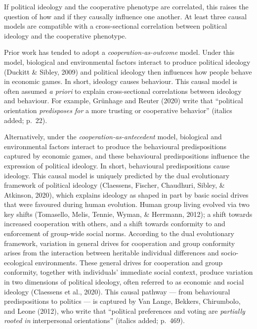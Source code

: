 \documentclass[
  man,floatsintext]{apa6}
\begin{document}
If political ideology and the cooperative phenotype are correlated, this raises the question of how and if they causally influence one another. At least three causal models are compatible with a cross-sectional correlation between political ideology and the cooperative phenotype.

Prior work has tended to adopt a \emph{cooperation-as-outcome} model. Under this model, biological and environmental factors interact to produce political ideology (Duckitt \& Sibley, 2009) and political ideology then influences how people behave in economic games. In short, ideology causes behaviour. This causal model is often assumed \emph{a priori} to explain cross-sectional correlations between ideology and behaviour. For example, Grünhage and Reuter (2020) write that ``political orientation \emph{predisposes for} a more trusting or cooperative behavior'' (italics added; p.~22).

Alternatively, under the \emph{cooperation-as-antecedent} model, biological and environmental factors interact to produce the behavioural predispositions captured by economic games, and these behavioural predispositions influence the expression of political ideology. In short, behavioural predispositions cause ideology. This causal model is uniquely predicted by the dual evolutionary framework of political ideology (Claessens, Fischer, Chaudhuri, Sibley, \& Atkinson, 2020), which explains ideology as shaped in part by basic social drives that were favoured during human evolution. Human group living evolved via two key shifts (Tomasello, Melis, Tennie, Wyman, \& Herrmann, 2012); a shift towards increased cooperation with others, and a shift towards conformity to and enforcement of group-wide social norms. According to the dual evolutionary framework, variation in general drives for cooperation and group conformity arises from the interaction between heritable individual differences and socio-ecological environments. These general drives for cooperation and group conformity, together with individuals' immediate social context, produce variation in two dimensions of political ideology, often referred to as economic and social ideology (Claessens et al., 2020). This causal pathway --- from behavioural predispositions to politics --- is captured by Van Lange, Bekkers, Chirumbolo, and Leone (2012), who write that ``political preferences and voting are \emph{partially rooted in} interpersonal orientations'' (italics added; p.~469).
\end{document}
